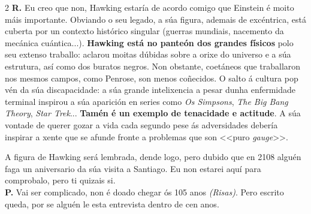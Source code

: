 \begin{refsection}
\begin{multicols}{2}
\noindent \textbf{R.} \hspace{5px} Eu creo que non, Hawking estaría de acordo comigo que Einstein é moito máis importante. Obviando o seu legado, a súa figura, ademais de excéntrica, está cuberta por un contexto histórico singular (guerras mundiais, nacemento da mecánica cuántica...). \textbf{Hawking está no panteón dos grandes físicos} polo seu extenso traballo: aclarou moitas dúbidas sobre a orixe do universo e a súa estrutura, así como dos buratos negros. Non obstante, coetáneos que traballaron nos mesmos campos, como Penrose, son menos coñecidos. O salto á cultura pop vén da súa discapacidade: a súa grande intelixencia a pesar dunha enfermidade terminal inspirou a súa aparición en series como \textit{Os Simpsons}, \textit{The Big Bang Theory}, \textit{Star Trek}... \textbf{Tamén é un exemplo de tenacidade e actitude}. A súa vontade de querer gozar a vida cada segundo pese ás adversidades debería inspirar a xente que se afunde fronte a problemas que son <<puro \emph{gauge}>>.

A figura de Hawking será lembrada, dende logo, pero dubido que en 2108 alguén faga un aniversario da súa visita a Santiago. Eu non estarei aquí para comprobalo, pero ti quizais si.\\

\noindent \textbf{P.} \hspace{5px} Vai ser complicado, non é doado chegar ós 105 anos \emph{(Risas)}. Pero escrito queda, por se alguén le esta entrevista dentro de cen anos.






\end{multicols}
\end{refsection}
